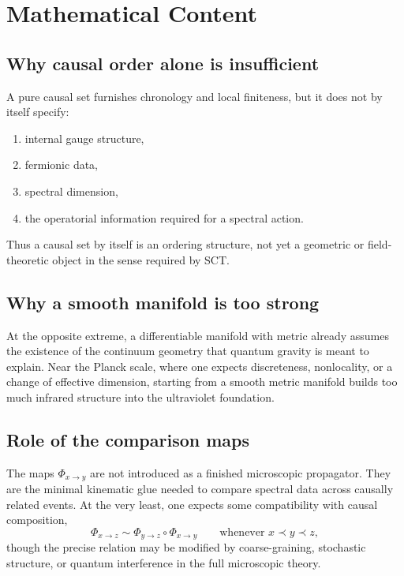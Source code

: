 \documentclass[12pt,a4paper]{article}
\theoremstyle{postulate}
\begin{document}
\section{Mathematical Content}
\label{sec:math-content}

\subsection{Why causal order alone is insufficient}

A pure causal set furnishes chronology and local finiteness, but it does not
by itself specify:
\begin{enumerate}[label=(\alph*)]
  \item internal gauge structure,
  \item fermionic data,
  \item spectral dimension,
  \item the operatorial information required for a spectral action.
\end{enumerate}
Thus a causal set by itself is an ordering structure, not yet a geometric or
field-theoretic object in the sense required by SCT.

\subsection{Why a smooth manifold is too strong}

At the opposite extreme, a differentiable manifold with metric already
assumes the existence of the continuum geometry that quantum gravity is meant
to explain.  Near the Planck scale, where one expects discreteness,
nonlocality, or a change of effective dimension, starting from a smooth
metric manifold builds too much infrared structure into the ultraviolet
foundation.

\subsection{Role of the comparison maps}

The maps $\Phi_{x\to y}$ are not introduced as a finished microscopic
propagator.  They are the minimal kinematic glue needed to compare spectral
data across causally related events.  At the very least, one expects some
compatibility with causal composition,
\begin{equation}
  \Phi_{x\to z}
  \sim \Phi_{y\to z}\circ \Phi_{x\to y}
  \qquad\text{whenever } x\prec y\prec z,
  \label{eq:composition}
\end{equation}
though the precise relation may be modified by coarse-graining, stochastic
structure, or quantum interference in the full microscopic theory.
\end{document}
